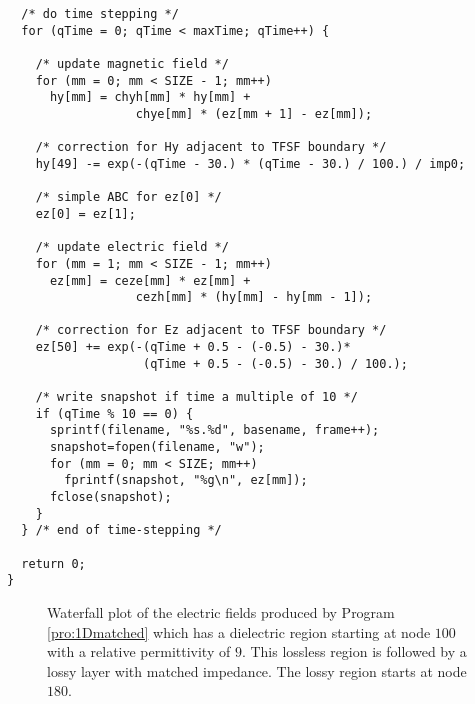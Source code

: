 \begin{program}
\begin{lstlisting}
  /* do time stepping */
  for (qTime = 0; qTime < maxTime; qTime++) {

    /* update magnetic field */
    for (mm = 0; mm < SIZE - 1; mm++)
      hy[mm] = chyh[mm] * hy[mm] + 
                  chye[mm] * (ez[mm + 1] - ez[mm]);

    /* correction for Hy adjacent to TFSF boundary */
    hy[49] -= exp(-(qTime - 30.) * (qTime - 30.) / 100.) / imp0;

    /* simple ABC for ez[0] */
    ez[0] = ez[1];

    /* update electric field */
    for (mm = 1; mm < SIZE - 1; mm++)
      ez[mm] = ceze[mm] * ez[mm] +
                  cezh[mm] * (hy[mm] - hy[mm - 1]);

    /* correction for Ez adjacent to TFSF boundary */
    ez[50] += exp(-(qTime + 0.5 - (-0.5) - 30.)*
                   (qTime + 0.5 - (-0.5) - 30.) / 100.);

    /* write snapshot if time a multiple of 10 */
    if (qTime % 10 == 0) {
      sprintf(filename, "%s.%d", basename, frame++);
      snapshot=fopen(filename, "w");
      for (mm = 0; mm < SIZE; mm++)
        fprintf(snapshot, "%g\n", ez[mm]);
      fclose(snapshot);
    }
  } /* end of time-stepping */

  return 0;
}
\end{lstlisting}
\end{program}

\begin{figure}
  \begin{center}
  \end{center} \caption{Waterfall plot of the electric fields produced
  by Program \ref{pro:1Dmatched} which has a dielectric region
  starting at node $100$ with a relative permittivity of $9$.  This
  lossless region is followed by a lossy layer with matched impedance.
  The lossy region starts at node $180$.}
  \label{fig:waterfallMatched}
\end{figure}
